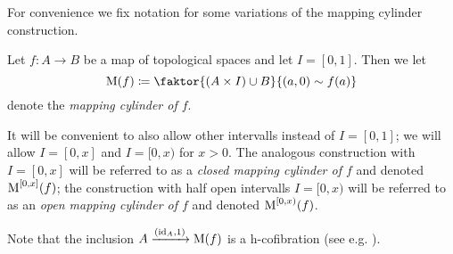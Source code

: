 For convenience we fix notation for some variations of the mapping cylinder construction.
\begin{definition}
    Let $f\colon A\to B$ be a map of topological spaces and let $I=[0,1]$.
    Then we let
    \begin{equation*}
        \M(f)\coloneqq\faktor{\left(A\times I\right)\cup B}{(a,0)\sim f(a)}
    \end{equation*}
    denote the \emph{mapping cylinder of $f$}.

    It will be convenient to also allow other intervalls instead of $I=[0,1]$; we will allow $I=[0,x]$ and $I=[0,x)$ for $x>0$.
    The analogous construction with $I=[0,x]$ will be referred to as a \emph{closed mapping cylinder of $f$} and denoted $\operatorname{M}^{[0,x]}(f)$;
    the construction with half open intervalls $I=[0,x)$ will be referred to as an \emph{open mapping cylinder of $f$} and denoted $\operatorname{M}^{[0,x)}(f)$.
\end{definition}
\begin{remark}
    Note that the inclusion $A\xrightarrow{(\text{id}_A,1)}\operatorname{M}(f)$ is a h-cofibration (see e.g. \cite[Theorem 2]{note_on_cofibs_1}).
\end{remark}

